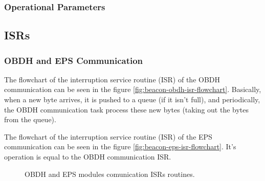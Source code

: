 \documentclass[12pt]{book}
\begin{document}
\subsubsection{Operational Parameters}



\subsection{ISRs}


\subsubsection{OBDH and EPS Communication}

The flowchart of the interruption service routine (ISR) of the OBDH communication can be seen in the figure \ref{fig:beacon-obdh-isr-flowchart}. Basically, when a new byte arrives, it is pushed to a queue (if it isn't full), and periodically, the OBDH communication task process these new bytes (taking out the bytes from the queue).

The flowchart of the interruption service routine (ISR) of the EPS communication can be seen in the figure \ref{fig:beacon-eps-isr-flowchart}. It's operation is equal to the OBDH communication ISR.

\begin{figure}[!h]
	\begin{center}
		\qquad
		\caption{OBDH and EPS modules comunication ISRs routines.}
		\label{fig:obdh-eps-isr-flowchart}
	\end{center}
\end{figure}
\end{document}
